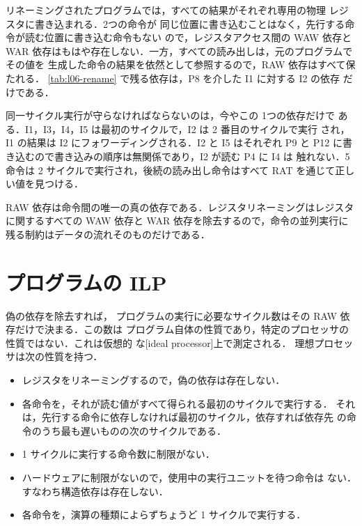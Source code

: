 \documentclass[../main.tex]{subfiles}
\begin{document}
リネーミングされたプログラムでは，すべての結果がそれぞれ専用の物理
レジスタに書き込まれる．2つの命令が
同じ位置に書き込むことはなく，先行する命令が読む位置に書き込む命令もない
ので，レジスタアクセス間の WAW 依存と WAR 依存はもはや存在しない．一方，すべての読み出しは，元のプログラムでその値を
生成した命令の結果を依然として参照するので，RAW 依存はすべて保たれる．%
\cref{tab:l06-rename} で残る依存は，P8 を介した I1 に対する I2 の依存
だけである．

同一サイクル実行が守らなければならないのは，今やこの 1つの依存だけで
ある．I1，I3，I4，I5 は最初のサイクルで，I2 は 2 番目のサイクルで実行
され，I1 の結果は I2 にフォワーディングされる．I2 と I5 はそれぞれ P9 と
P12 に書き込むので書き込みの順序は無関係であり，I2 が読む P4 に I4 は
触れない．5 命令は 2 サイクルで実行され，後続の読み出し命令はすべて RAT
を通じて正しい値を見つける．

\begin{keypoint}
  RAW 依存は命令間の唯一の真の依存である．レジスタリネーミングはレジスタ
  に関するすべての WAW 依存と WAR 依存を除去するので，命令の並列実行に
  残る制約はデータの流れそのものだけである．
\end{keypoint}

\section{プログラムの ILP}
\label{sec:l06-ilp}

偽の依存を除去すれば，%
%
プログラムの実行に必要なサイクル数はその RAW 依存だけで決まる．この数は
プログラム自体の性質であり，特定のプロセッサの性質ではない．これは仮想的
な[ideal processor]上で測定される．
理想プロセッサは次の性質を持つ．
\begin{itemize}
  \item レジスタをリネーミングするので，偽の依存は存在しない．
  \item 各命令を，それが読む値がすべて得られる最初のサイクルで実行する．
    それは，先行する命令に依存しなければ最初のサイクル，依存すれば依存先
    の命令のうち最も遅いものの次のサイクルである．
  \item 1 サイクルに実行する命令数に制限がない．
  \item ハードウェアに制限がないので，使用中の実行ユニットを待つ命令は
    ない．すなわち構造依存は存在しない．
  \item 各命令を，演算の種類によらずちょうど 1 サイクルで実行する．
\end{itemize}
\end{document}
